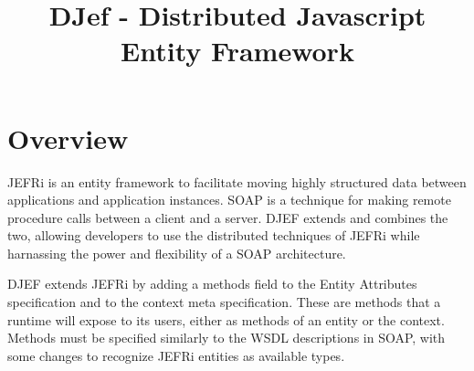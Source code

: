 \documentclass{article}
\begin{document}
\title{DJef - Distributed Javascript Entity Framework}
\maketitle
\tableofcontents
\newpage
\linespread{1.6}

\section{Overview}
JEFRi is an entity framework to facilitate moving highly structured data
between applications and application instances. SOAP is a technique for making
remote procedure calls between a client and a server. DJEF extends and
combines the two, allowing developers to use the distributed techniques of JEFRi
while harnassing the power and flexibility of a SOAP architecture.

DJEF extends JEFRi by adding a methods field to the Entity Attributes
specification and to the context meta specification. These are methods that a
runtime will expose to its users, either as methods of an entity or the context.
Methods must be specified similarly to the WSDL descriptions in SOAP, with some
changes to recognize JEFRi entities as available types.

\end{document}
